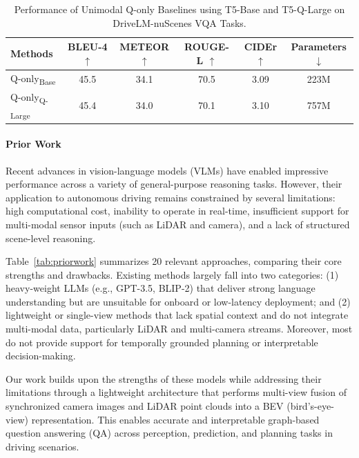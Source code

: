 \documentclass{article} %
\begin{document}
\begin{table}[H]
\centering
\small
\begin{tabular}{lccccc}
\toprule
\textbf{Methods} & \textbf{BLEU-4} $\uparrow$ & \textbf{METEOR} $\uparrow$ & \textbf{ROUGE-L} $\uparrow$ & \textbf{CIDEr} $\uparrow$ & \textbf{Parameters} $\downarrow$ \\
\midrule
Q-only\textsubscript{Base}   & 45.5 & 34.1 & 70.5 & 3.09 & 223M \\
Q-only\textsubscript{Q-Large}  & 45.4 & 34.0 & 70.1 & 3.10 & 757M \\
\bottomrule
\end{tabular}
\caption{Performance of Unimodal Q-only Baselines using T5-Base and T5-Q-Large on DriveLM-nuScenes VQA Tasks.}
\label{tab:qonly_results}
\end{table}


\FloatBarrier
\paragraph{Prior Work} 
Recent advances in vision-language models (VLMs) have enabled impressive performance across a variety of general-purpose reasoning tasks. However, their application to autonomous driving remains constrained by several limitations: high computational cost, inability to operate in real-time, insufficient support for multi-modal sensor inputs (such as LiDAR and camera), and a lack of structured scene-level reasoning.

Table~\ref{tab:priorwork} summarizes 20 relevant approaches, comparing their core strengths and drawbacks. Existing methods largely fall into two categories: (1) heavy-weight LLMs (e.g., GPT-3.5, BLIP-2) that deliver strong language understanding but are unsuitable for onboard or low-latency deployment; and (2) lightweight or single-view methods that lack spatial context and do not integrate multi-modal data, particularly LiDAR and multi-camera streams. Moreover, most do not provide support for temporally grounded planning or interpretable decision-making.

Our work builds upon the strengths of these models while addressing their limitations through a lightweight architecture that performs multi-view fusion of synchronized camera images and LiDAR point clouds into a BEV (bird's-eye-view) representation. This enables accurate and interpretable graph-based question answering (QA) across perception, prediction, and planning tasks in driving scenarios.
\end{document}
